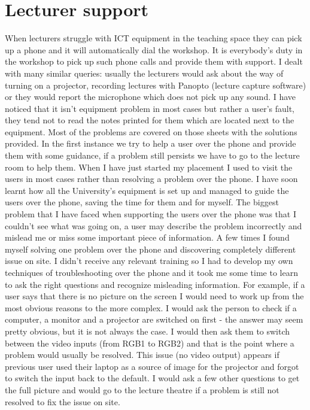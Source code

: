 \documentclass[10pt,a4paper,headinclude=true]{report}
\begin{document}
\section{Lecturer support}
When lecturers struggle with ICT equipment in the teaching space they can pick up a phone and it will automatically dial the workshop. It is everybody's duty in the workshop to pick up such phone calls and provide them with support. I dealt with many similar queries: usually the lecturers would ask about the way of turning on a projector, recording lectures with Panopto (lecture capture software) or they would report the microphone which does not pick up any sound. I have noticed that it isn't equipment problem in most cases but rather a user's fault, they tend not to read the notes printed for them which are located next to the equipment. Most of the problems are covered on those sheets with the solutions provided. In the first instance we try to help a user over the phone and provide them with some guidance, if a problem still persists we have to go to the lecture room to help them. When I have just started my placement I used to visit the users in most cases rather than resolving a problem over the phone. I have soon learnt how all the University's equipment is set up and managed to guide the users over the phone, saving the time for them and for myself. The biggest problem that I have faced when supporting the users over the phone was that I couldn't see what was going on, a user may describe the problem incorrectly and mislead me or miss some important piece of information. A few times I found myself solving one problem over the phone and discovering completely different issue on site. I didn't receive any relevant training so I had to develop my own techniques of troubleshooting over the phone and it took me some time to learn to ask the right questions and recognize misleading information. For example, if a user says that there is no picture on the screen I would need to work up from the most obvious reasons to the more complex. I would ask the person to check if a computer, a monitor and a projector are switched on first - the answer may seem pretty obvious, but it is not always the case. I would then ask them to switch between the video inputs (from RGB1 to RGB2) and that is the point where a problem would usually be resolved. This issue (no video output) appears if previous user used their laptop as a source of image for the projector and forgot to switch the input back to the default. I would ask a few other questions to get the full picture and would go to the lecture theatre if a problem is still not resolved to fix the issue on site.
\end{document}
